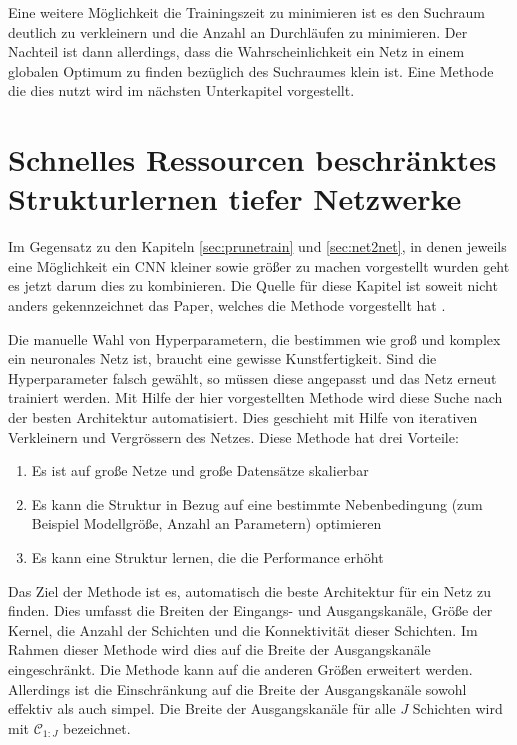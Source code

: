 Eine weitere Möglichkeit die Trainingszeit zu minimieren ist es den Suchraum deutlich zu verkleinern und die Anzahl an Durchläufen zu minimieren. Der Nachteil ist dann allerdings, dass die Wahrscheinlichkeit ein Netz in einem globalen Optimum zu finden bezüglich des Suchraumes klein ist. Eine Methode die dies nutzt wird im nächsten Unterkapitel vorgestellt.
\color{black}


\section{Schnelles Ressourcen beschränktes Strukturlernen tiefer Netzwerke}\label{sec:morphnet}
Im Gegensatz zu den Kapiteln \ref{sec:prunetrain} und \ref{sec:net2net}, in denen jeweils eine Möglichkeit ein CNN kleiner sowie größer zu machen vorgestellt wurden geht es jetzt darum dies zu kombinieren. Die Quelle für diese Kapitel ist soweit nicht anders gekennzeichnet das Paper, welches die Methode vorgestellt hat \cite{morphnet}.

Die manuelle Wahl von Hyperparametern, die bestimmen wie groß und komplex ein neuronales Netz ist, braucht eine gewisse Kunstfertigkeit. Sind die Hyperparameter falsch gewählt, so müssen diese angepasst und das Netz erneut trainiert werden. Mit Hilfe der hier vorgestellten Methode wird diese Suche nach der besten Architektur automatisiert. Dies geschieht mit Hilfe von iterativen Verkleinern und Vergrössern des Netzes. Diese Methode hat drei Vorteile:
\begin{enumerate}
 \item Es ist auf große Netze und große Datensätze skalierbar
 \item Es kann die Struktur in Bezug auf eine bestimmte Nebenbedingung (zum Beispiel Modellgröße, Anzahl an Parametern) optimieren
 \item Es kann eine Struktur lernen, die die Performance erhöht
\end{enumerate}

Das Ziel der Methode ist es, automatisch die beste Architektur für ein Netz zu finden. Dies umfasst die Breiten der Eingangs- und Ausgangskanäle, Größe der Kernel, die Anzahl der Schichten und die Konnektivität dieser Schichten. Im Rahmen dieser Methode wird dies auf die Breite der Ausgangskanäle eingeschränkt. Die Methode kann auf die anderen Größen erweitert werden. Allerdings ist die Einschränkung auf die Breite der Ausgangskanäle sowohl effektiv als auch simpel.
Die Breite der Ausgangskanäle für alle $J$ Schichten wird mit $\mathcal{C}_{1:J}$ bezeichnet. 

